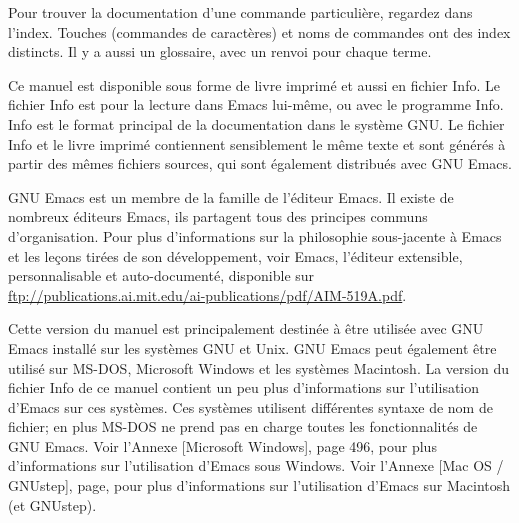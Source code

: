 Pour trouver la documentation d'une commande particulière, regardez
dans l'index. Touches (commandes de caractères) et noms de commandes
ont des index distincts. Il y a aussi un glossaire, avec un renvoi
pour chaque terme.\par

Ce manuel est disponible sous forme de livre imprimé et aussi en
fichier Info. Le fichier Info est pour la lecture dans Emacs lui-même,
ou avec le programme Info. Info est le format principal de la
documentation dans le système GNU. Le fichier Info et le livre imprimé
contiennent sensiblement le même texte et sont générés à partir des
mêmes fichiers sources, qui sont également distribués avec GNU
Emacs.\par

GNU Emacs est un membre de la famille de l'éditeur Emacs. Il existe de
nombreux éditeurs Emacs, ils partagent tous des principes communs
d'organisation. Pour plus d'informations sur la philosophie
sous-jacente à Emacs et les leçons tirées de son développement, voir
Emacs, l'éditeur extensible, personnalisable et auto-documenté,
disponible sur
\url{ftp://publications.ai.mit.edu/ai-publications/pdf/AIM-519A.pdf}.\par

Cette version du manuel est principalement destinée à être utilisée
avec GNU Emacs installé sur les systèmes GNU et Unix. GNU Emacs peut
également être utilisé sur MS-DOS, Microsoft Windows et les systèmes
Macintosh. La version du fichier Info de ce manuel contient un peu
plus d'informations sur l'utilisation d'Emacs sur ces systèmes. Ces
systèmes utilisent différentes syntaxe de nom de fichier; en plus
MS-DOS ne prend pas en charge toutes les fonctionnalités de GNU
Emacs. Voir l'Annexe [Microsoft Windows], page 496, pour plus
d'informations sur l'utilisation d'Emacs sous Windows. Voir l'Annexe
[Mac OS / GNUstep], page, pour plus d'informations sur
l'utilisation d'Emacs sur Macintosh (et GNUstep).\par
